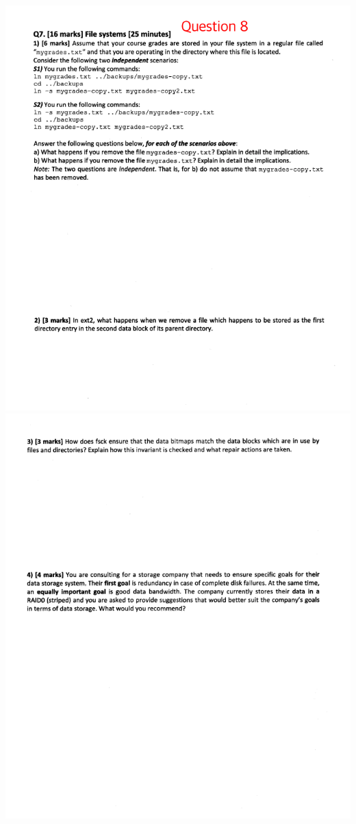 \documentclass[12pt]{article}
\begin{document}
\begin{center}
\includegraphics[width=\linewidth]{../images/midterm_4_13.png}
\includegraphics[width=\linewidth]{../images/midterm_4_14.png}

\end{center}
\end{document}

